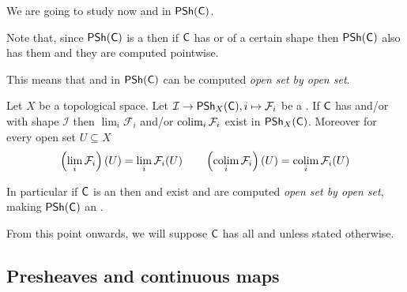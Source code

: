 \documentclass[../main.tex]{subfiles}
\begin{document}
We are going to study now  and  in \(\mathsf{PSh}(\mathsf{C})\).

Note that, since \(\mathsf{PSh}(\mathsf{C})\) is a  then if \(\mathsf{C}\) has  or  of a certain shape then \(\mathsf{PSh}(\mathsf{C})\) also has them and they are computed pointwise.

This means that  and  in \(\mathsf{PSh}(\mathsf{C})\) can be computed \textit{open set by open set}.

\begin{proposition}
  Let \(X\) be a topological space. Let \(\mathcal{I} \to \mathsf{PSh}_{X}(\mathsf{C}), i \mapsto \mathcal{F}_{i}\) be a .
  If \(\mathsf{C}\) has  and/or  with shape \(\mathcal{I}\) then \(\lim_{i} \mathcal{F}_{i}\) and/or \(\operatorname*{colim}_{i} \mathcal{F}_{i}\) exist in \(\mathsf{PSh}_{X}(\mathsf{C})\).
  Moreover for every open set \(U \subseteq X\)
  \begin{align*}
    \left( \lim_{i} \mathcal{F}_{i} \right)(U) = \lim_{i} \mathcal{F}_{i}(U) \qquad \left( \operatorname*{colim}_{i} \mathcal{F}_{i} \right)(U) = \operatorname*{colim}_{i} \mathcal{F}_{i}(U)
  \end{align*}
\end{proposition}

In particular if \(\mathsf{C}\) is an  then  and  exist and are computed \textit{open set by open set}, making \(\mathsf{PSh}(\mathsf{C})\) an .



\begin{remark}
  From this point onwards, we will suppose \(\mathsf{C}\) has all  and  unless stated otherwise.
\end{remark}

\subsection{Presheaves and continuous maps}
\end{document}
